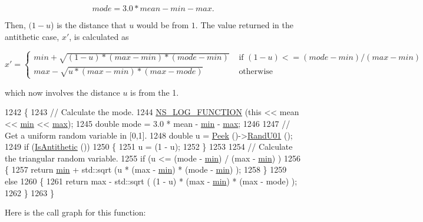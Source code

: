 \[ mode = 3.0 * mean - min - max . \]

Then, $(1 - u$) is the distance that $u$ would be from $1$. The value returned in the antithetic case, $x'$, is calculated as

\[ x' = \left\{ \begin{array}{rl} min + \sqrt{(1 - u) * (max - min) * (mode - min)} &\mbox{ if $(1 - u) <= (mode - min)/(max - min)$} \\ max - \sqrt{ u * (max - min) * (max - mode) } &\mbox{ otherwise} \end{array} \right. \]

which now involves the distance $u$ is from the 1. 
\begin{DoxyCode}
1242 \{
1243   \textcolor{comment}{// Calculate the mode.}
1244   \hyperlink{log-macros-disabled_8h_a90b90d5bad1f39cb1b64923ea94c0761}{NS\_LOG\_FUNCTION} (\textcolor{keyword}{this} << mean << \hyperlink{80211b_8c_ac6afabdc09a49a433ee19d8a9486056d}{min} << \hyperlink{80211b_8c_affe776513b24d84b39af8ab0930fef7f}{max});
1245   \textcolor{keywordtype}{double} mode = 3.0 * mean - \hyperlink{80211b_8c_ac6afabdc09a49a433ee19d8a9486056d}{min} - \hyperlink{80211b_8c_affe776513b24d84b39af8ab0930fef7f}{max};
1246 
1247   \textcolor{comment}{// Get a uniform random variable in [0,1].}
1248   \textcolor{keywordtype}{double} u = \hyperlink{classns3_1_1RandomVariableStream_ac5aa8d691c061bcc88a909dc9b479222}{Peek} ()->\hyperlink{classns3_1_1RngStream_a46be36426b8bc712e9de468b63558c22}{RandU01} ();
1249   \textcolor{keywordflow}{if} (\hyperlink{classns3_1_1RandomVariableStream_a7bf5175d624b14bd023f8c4f78bc5fd7}{IsAntithetic} ())
1250     \{
1251       u = (1 - u);
1252     \}
1253 
1254   \textcolor{comment}{// Calculate the triangular random variable.}
1255   \textcolor{keywordflow}{if} (u <= (mode - \hyperlink{80211b_8c_ac6afabdc09a49a433ee19d8a9486056d}{min}) / (max - \hyperlink{80211b_8c_ac6afabdc09a49a433ee19d8a9486056d}{min}) )
1256     \{
1257       \textcolor{keywordflow}{return} \hyperlink{80211b_8c_ac6afabdc09a49a433ee19d8a9486056d}{min} + std::sqrt (u * (max - \hyperlink{80211b_8c_ac6afabdc09a49a433ee19d8a9486056d}{min}) * (mode - \hyperlink{80211b_8c_ac6afabdc09a49a433ee19d8a9486056d}{min}) );
1258     \}
1259   \textcolor{keywordflow}{else}
1260     \{
1261       \textcolor{keywordflow}{return} max - std::sqrt ( (1 - u) * (max - \hyperlink{80211b_8c_ac6afabdc09a49a433ee19d8a9486056d}{min}) * (max - mode) );
1262     \}
1263 \}
\end{DoxyCode}


Here is the call graph for this function\+:


